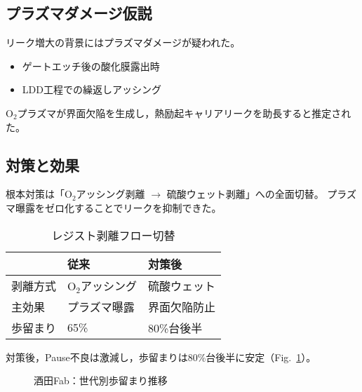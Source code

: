 \documentclass[conference]{IEEEtran}
\begin{document}
\subsection{プラズマダメージ仮説}
リーク増大の背景にはプラズマダメージが疑われた。
\begin{itemize}
  \item ゲートエッチ後の酸化膜露出時
  \item LDD工程での繰返しアッシング
\end{itemize}
O$_2$プラズマが界面欠陥を生成し，熱励起キャリアリークを助長すると推定された。

\subsection{対策と効果}
根本対策は「O$_2$アッシング剥離 $\rightarrow$ 硫酸ウェット剥離」への全面切替。
プラズマ曝露をゼロ化することでリークを抑制できた。

\begin{table}[h]
  \centering
  \caption{レジスト剥離フロー切替}
  \label{tab:resist}
  \begin{tabular}{lll}
    \toprule
    & 従来 & 対策後 \\
    \midrule
    剥離方式 & O$_2$アッシング & 硫酸ウェット \\
    主効果 & プラズマ曝露 & 界面欠陥防止 \\
    歩留まり & 65\% & 80\%台後半 \\
    \bottomrule
  \end{tabular}
\end{table}

対策後，Pause不良は激減し，歩留まりは80\%台後半に安定（Fig.~\ref{fig:yield25}）。

\begin{figure}[t]
\centering
{}
\caption{酒田Fab：世代別歩留まり推移}
\label{fig:yield25}
\end{figure}
\end{document}
